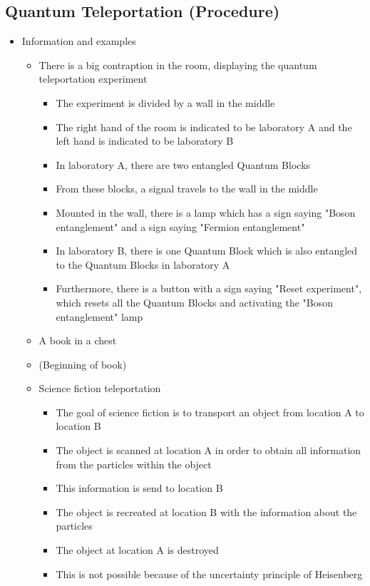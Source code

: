 \documentclass[11pt,twoside]{report} %
\begin{document}
\subsection{Quantum Teleportation (Procedure)}
\begin{itemize}
	\item Information and examples
	\begin{itemize}
		\item There is a big contraption in the room, displaying the quantum teleportation experiment
		\begin{itemize}
			\item The experiment is divided by a wall in the middle
			\item The right hand of the room is indicated to be laboratory A and the left hand is indicated to be laboratory B
			\item In laboratory A, there are two entangled Quantum Blocks
			\item From these blocks, a signal travels to the wall in the middle
			\item Mounted in the wall, there is a lamp which has a sign saying "Boson entanglement" and a sign saying "Fermion entanglement"
			\item In laboratory B, there is one Quantum Block which is also entangled to the Quantum Blocks in laboratory A
			\item Furthermore, there is a button with a sign saying "Reset experiment", which resets all the Quantum Blocks and activating the "Boson entanglement" lamp
		\end{itemize}
		\item A book in a chest
		\item (Beginning of book)
		\item Science fiction teleportation
		\begin{itemize}
			\item The goal of science fiction is to transport an object from location A to location B
			\item The object is scanned at location A in order to obtain all information from the particles within the object
			\item This information is send to location B
			\item The object is recreated at location B with the information about the particles
			\item The object at location A is destroyed
			\item This is not possible because of the uncertainty principle of Heisenberg

\end{itemize}
\end{itemize}
\end{itemize}
\end{document}
